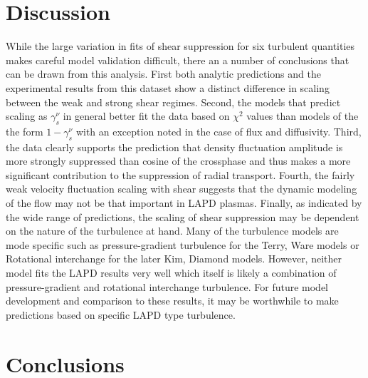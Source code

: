\documentclass[aip,pop,amsmath,amssymb,preprint,superscriptaddress]{revtex4-1} %
\begin{document}
\section{Discussion}

While the large variation in fits of shear suppression for six turbulent quantities makes careful model validation difficult, there an a number of conclusions that can be drawn from this analysis. First both analytic predictions and the experimental results from this dataset show a distinct difference in scaling between the weak and strong shear regimes. Second, the models that predict scaling as $\gamma_{s}^{\nu}$ in general better fit the data based on $\chi^{2}$ values than models of the the form $1-\gamma_{s}^{\nu}$ with an exception noted in the case of flux and diffusivity. Third, the data clearly supports the prediction that density fluctuation amplitude is more strongly suppressed than cosine of the crossphase and thus makes a more significant contribution to the suppression of radial transport. Fourth, the fairly weak velocity fluctuation scaling with shear suggests that the dynamic modeling of the flow may not be that important in LAPD plasmas. Finally, as indicated by the wide range of predictions, the scaling of shear suppression may be dependent on the nature of the turbulence at hand. Many of the turbulence models are mode specific such as pressure-gradient turbulence for the Terry, Ware models or Rotational interchange for the later Kim, Diamond models. However, neither model fits the LAPD results very well which itself is likely a combination of pressure-gradient and rotational interchange turbulence. For future model development and comparison to these results, it may be worthwhile to make predictions based on specific LAPD type turbulence.

\section{Conclusions}
\end{document}
